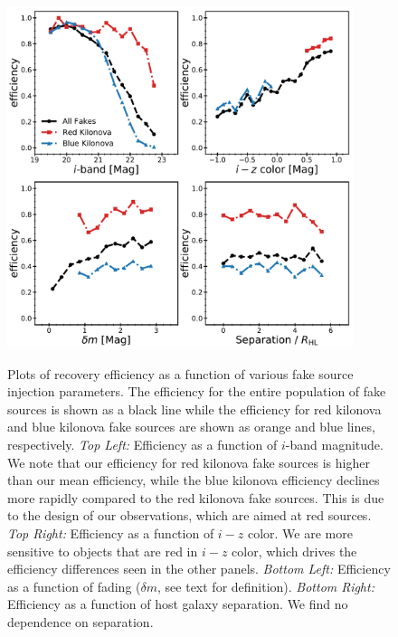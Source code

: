 \begin{figure}[!t]
\begin{center}
\hspace*{-0.1in}
\scalebox{1.}
{\includegraphics[width=0.9\textwidth]{./figs/chapter3/f6.pdf}}
\caption{Plots of recovery efficiency as a function of various fake source injection parameters. The efficiency for the entire population of fake sources is shown as a black line while the efficiency for red kilonova and blue kilonova fake sources are shown as orange and blue lines, respectively. {\it Top Left:} Efficiency as a function of $i$-band magnitude. We note that our efficiency for red kilonova fake sources is higher than our mean efficiency, while the blue kilonova efficiency declines more rapidly compared to the red kilonova fake sources. This is due to the design of our observations, which are aimed at red sources. {\it Top Right:} Efficiency as a function of $i-z$ color. We are more sensitive to objects that are red in $i-z$ color, which drives the efficiency differences seen in the other panels. {\it Bottom Left:} Efficiency as a function of fading ($\delta m$, see text for definition). {\it Bottom Right:} Efficiency as a function of host galaxy separation. We find no dependence on separation.}
\label{fig:ch3_eff_1D}
\end{center}
\end{figure}

